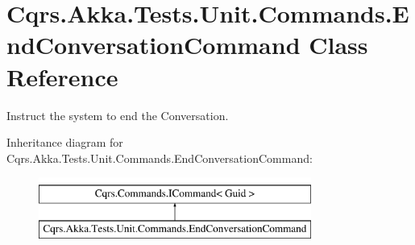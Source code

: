 \hypertarget{classCqrs_1_1Akka_1_1Tests_1_1Unit_1_1Commands_1_1EndConversationCommand}{}\section{Cqrs.\+Akka.\+Tests.\+Unit.\+Commands.\+End\+Conversation\+Command Class Reference}
\label{classCqrs_1_1Akka_1_1Tests_1_1Unit_1_1Commands_1_1EndConversationCommand}


Instruct the system to end the Conversation.  


Inheritance diagram for Cqrs.\+Akka.\+Tests.\+Unit.\+Commands.\+End\+Conversation\+Command\+:\begin{figure}[H]
\begin{center}
\leavevmode
\includegraphics[height=2.000000cm]{classCqrs_1_1Akka_1_1Tests_1_1Unit_1_1Commands_1_1EndConversationCommand}
\end{center}
\end{figure}
